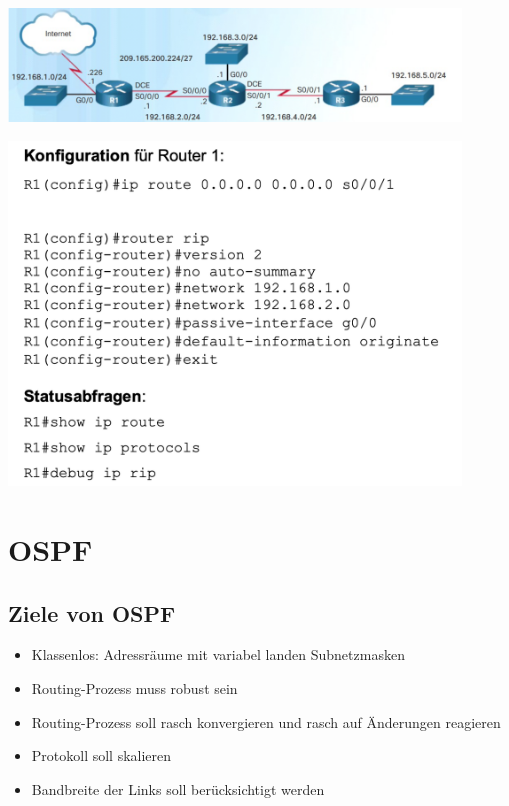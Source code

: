 \documentclass[a4paper,12pt]{article}
\begin{document}
\begin{center}
\includegraphics[width=12cm]{img/13_rip.png}
\end{center}


\begin{center}
\includegraphics[width=12cm]{img/13_rip2.png}
\end{center}





\section{OSPF}
\subsection{Ziele von OSPF}
\begin{itemize}
\item Klassenlos: Adressräume mit variabel landen Subnetzmasken
\item Routing-Prozess muss robust sein
\item Routing-Prozess soll rasch konvergieren und rasch auf Änderungen reagieren
\item Protokoll soll skalieren
\item Bandbreite der Links soll berücksichtigt werden
\end{itemize}
\end{document}
